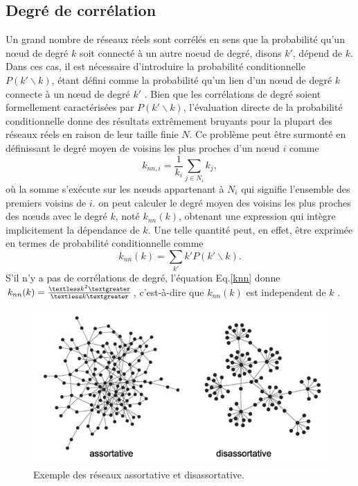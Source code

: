 \subsection{Degré de corrélation} 
Un grand nombre de réseaux réels sont corrélés en sens que la probabilité qu'un nœud de degré $k$ soit connecté à un autre
noeud de degré, disons $k'$, dépend de $k$. Dans ces cas, il est nécessaire d'introduire la probabilité conditionnelle 
$P(k'\backslash k)$, étant défini comme la probabilité qu'un lien d'un nœud de degré $k$ connecte à un nœud de degré 
$k'$ \cite{BP2002}. Bien que les corrélations de degré soient formellement caractérisées par $P(k'\backslash k)$, l'évaluation
directe de la probabilité conditionnelle donne des résultats extrêmement bruyants pour la plupart des réseaux réels en raison
de leur taille finie $N$. Ce problème peut être surmonté en définissant le degré moyen de voisins les plus proches d'un nœud $i$
comme
\begin{equation}
 k_{nn,i}=\frac{1}{k_i}\sum_{j\in N_i}k_j,
\end{equation}
où la somme s'exécute sur les nœuds appartenant à $N_i$ qui signifie l'ensemble des premiers voisins de $i$. on peut calculer le degré 
moyen des voisins les plus proches des nœuds avec le degré $k$, noté $k_{nn}(k)$, obtenant une expression qui intègre implicitement
la dépendance de $k$. Une telle quantité peut, en effet, être exprimée en termes de probabilité conditionnelle comme
\begin{equation}
 k_{nn}(k)=\sum_{k'}k'P(k'\backslash k).
 \label{knn}
\end{equation}
S'il n'y a pas de corrélations de degré, l'équation Eq.\ref{knn} donne
$k_{nn}(k)=\frac{\textless k^2\textgreater}{\textless k\textgreater}$, c'est-à-dire que $k_{nn}(k)$ est independent de $k$
\cite{Bo-al2006}.\\
\begin{figure}[h!]
	\centering
	\includegraphics[scale=0.6]{./figures/assortative_disassortative}
	\caption{Exemple des réseaux assortative et disassortative.}
	\label{assortative_disassortative}
\end{figure}
\label{s-correl}

